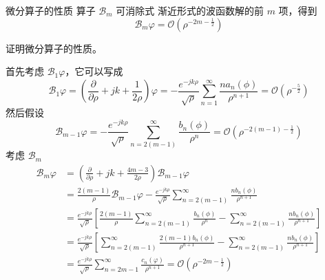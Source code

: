 \begin{theorem}{微分算子的性质}
    算子 $\mathcal{B}_m$ 可消除式
    渐近形式的波函数解的前 $m$ 项，得到
    \begin{equation}
        \mathcal{B}_m\varphi=
        \mathcal{O}\left(
            \rho^{-2m-\frac{1}{2}}
        \right)
        \label{微分算子的性质}
    \end{equation}
\end{theorem}

\begin{exercise}
    证明微分算子的性质。
\end{exercise}

\begin{solution}
    首先考虑 $\mathcal{B}_1\varphi$，它可以写成
    \begin{equation*}
        \mathcal{B}_1\varphi=
        \left(
            \frac{\partial}{\partial \rho}
            +jk+\frac{1}{2\rho}
        \right)\varphi
        =-\frac{e^{-jk\rho}}{\sqrt{\rho}}
        \sum_{n=1}^{\infty}\frac{n a_n(\phi)}{\rho^{n+1}}
        =\mathcal{O}\left(
            \rho^{-\frac{5}{2}}
        \right)
    \end{equation*}
    然后假设
    \begin{equation*}
        \mathcal{B}_{m-1}\varphi
        =-\frac{e^{-jk\rho}}{\sqrt{\rho}}
        \sum_{n=2(m-1)}^{\infty}\frac{b_n(\phi)}{\rho^{n}}
        =\mathcal{O}\left(
            \rho^{-2(m-1)-\frac{1}{2}}
        \right)
    \end{equation*}
    考虑 $\mathcal{B}_{m}$
    \begin{equation*}
        \begin{aligned}
            \mathcal{B}_{m}\varphi
            &=
            \left(
                \frac{\partial}{\partial \rho}
                +jk+\frac{4m-3}{2\rho}
            \right)\mathcal{B}_{m-1}\varphi\\
            &=\frac{2(m-1)}{\rho}\mathcal{B}_{m-1}\varphi
            -\frac{e^{-jk\rho}}{\sqrt{\rho}}
            \sum_{n=2(m-1)}^{\infty}
            \frac{n b_n(\phi)}{\rho^{n+1}}\\
            &=\frac{e^{-jk\rho}}{\sqrt{\rho}}
            \left[
                \frac{2(m-1)}{\rho}
                \sum_{n=2(m-1)}^{\infty}
                \frac{b_n(\phi)}{\rho^{n}}
                -\sum_{n=2(m-1)}^{\infty}
                \frac{n b_n(\phi)}{\rho^{n+1}}
            \right]\\
            &=\frac{e^{-jk\rho}}{\sqrt{\rho}}
            \left[
                \sum_{n=2(m-1)}^{\infty}
                \frac{2(m-1)b_n(\phi)}{\rho^{n+1}}
                -\sum_{n=2(m-1)}^{\infty}
                \frac{n b_n(\phi)}{\rho^{n+1}}
            \right]\\
            &=\frac{e^{-jk\rho}}{\sqrt{\rho}}
            \sum_{n=2m-1}^{\infty}
            \frac{c_n(\varphi)}{\rho^{n+1}}
            =\mathcal{O}\left(
                \rho^{-2m-\frac{1}{2}}
            \right)
        \end{aligned}
    \end{equation*}
\end{solution}

